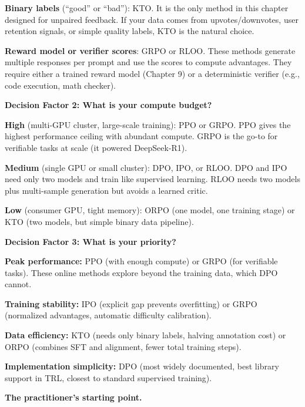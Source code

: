 \begin{chapterenv}
\begin{infobox}
\textbf{Binary labels} (``good'' or ``bad''): KTO. It is the only method in this chapter designed for unpaired feedback. If your data comes from upvotes/downvotes, user retention signals, or simple quality labels, KTO is the natural choice.

\textbf{Reward model or verifier scores}: GRPO or RLOO. These methods generate multiple responses per prompt and use the scores to compute advantages. They require either a trained reward model (Chapter 9) or a deterministic verifier (e.g., code execution, math checker).
\end{infobox}

\begin{infobox}
\textbf{Decision Factor 2: What is your compute budget?}

\textbf{High} (multi-GPU cluster, large-scale training): PPO or GRPO. PPO gives the highest performance ceiling with abundant compute. GRPO is the go-to for verifiable tasks at scale (it powered DeepSeek-R1).

\textbf{Medium} (single GPU or small cluster): DPO, IPO, or RLOO. DPO and IPO need only two models and train like supervised learning. RLOO needs two models plus multi-sample generation but avoids a learned critic.

\textbf{Low} (consumer GPU, tight memory): ORPO (one model, one training stage) or KTO (two models, but simple binary data pipeline).
\end{infobox}

\begin{infobox}
\textbf{Decision Factor 3: What is your priority?}

\textbf{Peak performance:} PPO (with enough compute) or GRPO (for verifiable tasks). These online methods explore beyond the training data, which DPO cannot.

\textbf{Training stability:} IPO (explicit gap prevents overfitting) or GRPO (normalized advantages, automatic difficulty calibration).

\textbf{Data efficiency:} KTO (needs only binary labels, halving annotation cost) or ORPO (combines SFT and alignment, fewer total training steps).

\textbf{Implementation simplicity:} DPO (most widely documented, best library support in TRL, closest to standard supervised training).
\end{infobox}

\begin{tipbox}
\textbf{The practitioner's starting point.}


\end{tipbox}
\end{chapterenv}
